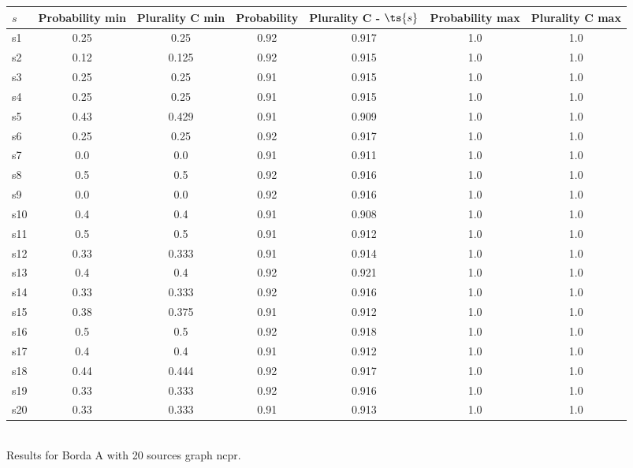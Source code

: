 \documentclass{article}
\begin{document}
\noindent\begin{tabular}{|l|c|c|c|c|c|c|}
\hline
$s$& Probability min & Plurality C min & Probability & Plurality C - $\ts{s}$ & Probability max & Plurality C max\\
\hline
s1 &0.25 & 0.25 & 0.92 & 0.917 & 1.0 & 1.0\\
\hline
s2 &0.12 & 0.125 & 0.92 & 0.915 & 1.0 & 1.0\\
\hline
s3 &0.25 & 0.25 & 0.91 & 0.915 & 1.0 & 1.0\\
\hline
s4 &0.25 & 0.25 & 0.91 & 0.915 & 1.0 & 1.0\\
\hline
s5 &0.43 & 0.429 & 0.91 & 0.909 & 1.0 & 1.0\\
\hline
s6 &0.25 & 0.25 & 0.92 & 0.917 & 1.0 & 1.0\\
\hline
s7 &0.0 & 0.0 & 0.91 & 0.911 & 1.0 & 1.0\\
\hline
s8 &0.5 & 0.5 & 0.92 & 0.916 & 1.0 & 1.0\\
\hline
s9 &0.0 & 0.0 & 0.92 & 0.916 & 1.0 & 1.0\\
\hline
s10 &0.4 & 0.4 & 0.91 & 0.908 & 1.0 & 1.0\\
\hline
s11 &0.5 & 0.5 & 0.91 & 0.912 & 1.0 & 1.0\\
\hline
s12 &0.33 & 0.333 & 0.91 & 0.914 & 1.0 & 1.0\\
\hline
s13 &0.4 & 0.4 & 0.92 & 0.921 & 1.0 & 1.0\\
\hline
s14 &0.33 & 0.333 & 0.92 & 0.916 & 1.0 & 1.0\\
\hline
s15 &0.38 & 0.375 & 0.91 & 0.912 & 1.0 & 1.0\\
\hline
s16 &0.5 & 0.5 & 0.92 & 0.918 & 1.0 & 1.0\\
\hline
s17 &0.4 & 0.4 & 0.91 & 0.912 & 1.0 & 1.0\\
\hline
s18 &0.44 & 0.444 & 0.92 & 0.917 & 1.0 & 1.0\\
\hline
s19 &0.33 & 0.333 & 0.92 & 0.916 & 1.0 & 1.0\\
\hline
s20 &0.33 & 0.333 & 0.91 & 0.913 & 1.0 & 1.0\\
\hline
\end{tabular}\\

\noindent Results for Borda A with 20 sources graph ncpr.
\end{document}
